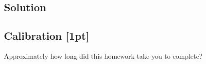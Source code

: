 \documentclass[submit]{harvardml}
\begin{document}
\subsection*{Solution}



\newpage

\subsection*{Calibration [1pt]}
Approximately how long did this homework take you to complete?
\end{document}
